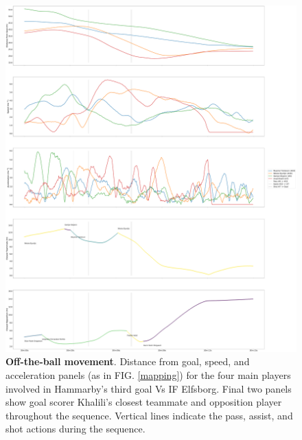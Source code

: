 \documentclass[twocolumn,prl,nobalancelastpage,aps,10pt]{revtex4-1}
\begin{document}
\begin{figure}
\includegraphics*[width=0.96\linewidth,clip]{NiceGoalAdded}
\caption{\textbf{Off-the-ball movement}. Distance from goal, speed, and acceleration panels (as in FIG. \ref{mapping}) for the four main players involved in Hammarby's third goal Vs IF Elfsborg. Final two panels show goal scorer Khalili's closest teammate and opposition player throughout the sequence. Vertical lines indicate the pass, assist, and shot actions during the sequence.}
\label{teamgoal}
\end{figure}
\end{document}
